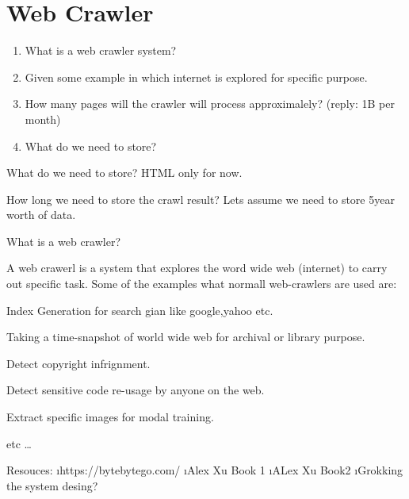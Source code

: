 \documentclass{../latex-setting/cmemoir}
\begin{document}
\tableofcontents


\chapter{Web Crawler}


\begin{exercise}
\begin{enumerate}
    \item What is a web crawler system? 
    \item Given some example in which internet is explored for specific purpose.
    \item How many pages will the crawler will process  approximalely? (reply: 1B per month)
    \item What do we need to store?
    
\end{enumerate}

\end{exercise}

\qicon What do we need to store?
\sicon HTML only for now.

\qicon How long we need to store the crawl result?
\sicon Lets assume we need to store 5year worth of data.



\newpage
\label{answers}
\begin{question}{What is a web crawler?}
   
    A web crawerl is a system that explores the word wide web (internet) to carry out specific task. Some of the examples what normall web-crawlers are used are:
    \begin{compactenum}[(i)]
        \item Index Generation for search gian like google,yahoo etc.
        \item Taking a time-snapshot of world wide web for archival or library purpose.
        \item Detect copyright infrignment.
        \item Detect sensitive code re-usage by anyone on the web.
        \item Extract specific images for modal training.
        \item etc \dots
    \end{compactenum}

\end{question}













Resouces:
\lstart
    \i https://bytebytego.com/
    \i Alex Xu Book 1
    \i ALex Xu Book2
    \i Grokking the system desing?
\lend
\end{document}

